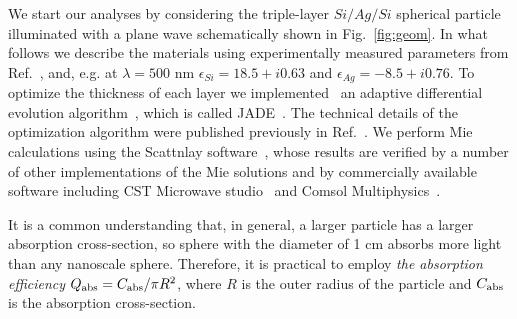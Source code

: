 \documentclass[aps,prl,twocolumn,showpacs,superscriptaddress,groupedaddress]{revtex4-1}  %
\begin{document}
We start our analyses by considering the triple-layer $Si/Ag/Si$
spherical particle illuminated with a plane wave schematically shown
in Fig.~\ref{fig:geom}. In what follows we describe the materials
using experimentally measured parameters from Ref.~\cite{palik-1997},
and, e.g. at $\lambda = 500$ nm $\epsilon_{Si} = 18.5 + i0.63$ and
$\epsilon_{Ag} = -8.5 + i0.76$.  To optimize the thickness of each
layer we implemented~\cite{JADE-web} an adaptive differential
evolution algorithm~\cite{Storn-DE-first-1997}, which is called
JADE~\cite{Jingqiao-JADE-2009}.  The technical details of the
optimization algorithm were published previously in
Ref.~\cite{Ladutenko-2014}. We perform Mie calculations using the
Scattnlay software~\cite{Pena-scattnlay-2009,Scattnlay-web}, whose
results are verified by a number of other implementations of the Mie
solutions and by commercially available software including CST
Microwave studio~\cite{CST-web} and Comsol
Multiphysics~\cite{Comsol-web}.

It is a common understanding that, in general, a larger particle has a
larger absorption cross-section, so sphere with the diameter of 1 cm
absorbs more light than any nanoscale sphere. Therefore, it is
practical to employ {\em the absorption efficiency} $Q_{\rm
  abs}=C_{\rm abs}/\pi R^2$, where $R$ is the outer radius of the
particle and $C_{\rm abs}$ is the absorption cross-section.
\end{document}
